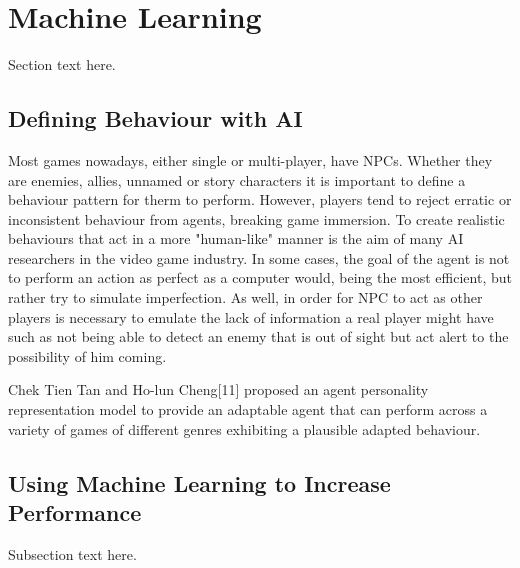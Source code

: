 \section{Machine Learning}
Section text here.
\vspace{2mm}

\subsection{Defining Behaviour with AI}
Most games nowadays, either single or multi-player, have NPCs. Whether they are enemies, allies, unnamed or story characters it is important to define a behaviour pattern for therm to perform. However, players tend to reject erratic or inconsistent behaviour from agents, breaking game immersion. To create realistic behaviours that act in a more "human-like" manner is the aim of many AI researchers in the video game industry. In some cases, the goal of the agent is not to perform an action as perfect as a computer would, being the most efficient, but rather try to simulate imperfection. As well, in order for NPC to act as other players is necessary to emulate the lack of information a real player might have such as not being able to detect an enemy that is out of sight but act alert to the possibility of him coming. 

\vspace{2mm}
Chek Tien Tan and Ho-lun Cheng[11] proposed an agent personality representation model to provide an adaptable agent that can perform across a variety of games of different genres exhibiting a plausible adapted behaviour.


\subsection{Using Machine Learning to Increase Performance}
Subsection text here.
\vspace{2mm}